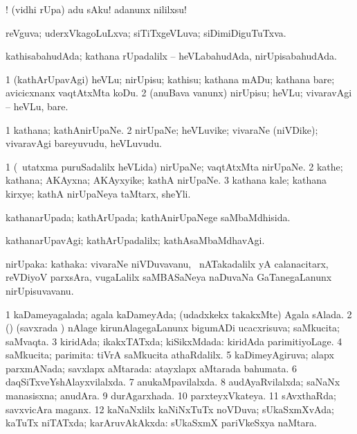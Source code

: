 \noindent
\gl{\pagu}
\bmng
 ! (vidhi rUpa) adu sAku! adanunx nililxsu! 
\emng
\eentry

\bentry
{}
\gl{\gu}
\bmng
reVguva; uderxVkagoLuLxva; siTiTxgeVLuva; siDimiDiguTuTxva. 
\emng
\eentry

\bentry
{}
\gl{\gu}
\bmng
kathisabahudAda; kathana rUpadalilx -- heVLabahudAda, nirUpisabahudAda. 
\emng
\eentry

\bentry
{}
\gl{\sakirx}
\bmng
\bnum
\num{1} (kathArUpavAgi) heVLu; nirUpisu; kathisu; kathana mADu; kathana bare; avicicxnanx vaqtAtxMta koDu. 
\num{2} (anuBava \mo vanunx) nirUpisu; heVLu; vivaravAgi -- heVLu, bare. 
\enum
\emng
\eentry

\bentry
{}
\gl{\nA}
\bmng
\bnum
\num{1} kathana; kathAnirUpaNe. 
\num{2} nirUpaNe; heVLuvike; vivaraNe (niVDike); vivaravAgi bareyuvudu, heVLuvudu. 
\enum
\emng
\eentry

\bentry
{}
\gl{\nA}
\bmng
\bnum
\num{1} (\kanmu\ utatxma puruSadalilx heVLida) nirUpaNe; vaqtAtxMta nirUpaNe. 
\num{2} kathe; kathana; AKAyxna; AKAyxyike; kathA nirUpaNe. 
\num{3} kathana kale; kathana kirxye; kathA nirUpaNeya taMtarx, sheYli. 
\enum
\emng
\eentry

\bentry
{}
\gl{\gu}
\bmng
kathanarUpada; kathArUpada; kathAnirUpaNege saMbaMdhisida. 
\emng
\eentry

\bentry
{}
\gl{\kirxvi}
\bmng
kathanarUpavAgi; kathArUpadalilx; kathAsaMbaMdhavAgi. 
\emng
\eentry

\bentry
{}
\gl{\nA}
\bmng
nirUpaka: kathaka: vivaraNe niVDuvavanu, \udA\ nATakadalilx yA calanacitarx, reVDiyoV parxsAra, \mo vugaLalilx saMBASaNeya naDuvaNa GaTanegaLanunx nirUpisuvavanu. 
\emng
\eentry

\bentry
{}
\gl{\gu}
\bmng
\bnum
\num{1} kaDameyagalada; agala kaDameyAda; (udadxkekx takakxMte) Agala sAlada. 
\num{2} (\vAyx) (savxrada \vi) nAlage kirunAlagegaLanunx bigumADi ucacxrisuva; saMkucita; saMvaqta. 
\num{3} kiridAda; ikakxTATxda; kiSikxMdada:  kiridAda parimitiyoLage. 
\num{4} saMkucita; parimita:  tiVrA saMkucita athaRdalilx. 
\num{5} kaDimeyAgiruva; alapx parxmANada; savxlapx aMtarada:  atayxlapx aMtarada bahumata. 
\num{6} daqSiTxveYshAlayxvilalxda. 
\num{7} anukaMpavilalxda. 
\num{8} audAyaRvilalxda; saNaNx manasisxna; anudAra. 
\num{9} durAgarxhada. 
\num{10} parxteyxVkateya. 
\num{11} sAvxthaRda; savxvicAra maganx. 
\num{12} kaNaNxlilx kaNiNxTuTx noVDuva; sUkaSxmXvAda; kaTuTx niTATxda; karAruvAkAkxda:  sUkaSxmX pariVkeSxya naMtara. 
\enum
\emng

